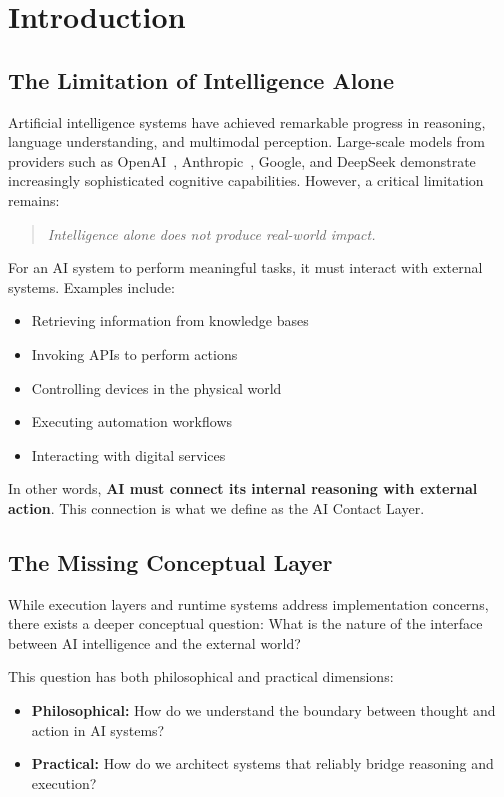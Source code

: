\section{Introduction}

\subsection{The Limitation of Intelligence Alone}
Artificial intelligence systems have achieved remarkable progress in reasoning, language understanding, and multimodal perception. Large-scale models from providers such as OpenAI~\cite{openai2023}, Anthropic~\cite{anthropic2024}, Google, and DeepSeek demonstrate increasingly sophisticated cognitive capabilities. However, a critical limitation remains:

\begin{quote}
\textit{Intelligence alone does not produce real-world impact.}
\end{quote}

For an AI system to perform meaningful tasks, it must interact with external systems. Examples include:
\begin{itemize}[leftmargin=*]
\item Retrieving information from knowledge bases
\item Invoking APIs to perform actions
\item Controlling devices in the physical world
\item Executing automation workflows
\item Interacting with digital services
\end{itemize}

In other words, \textbf{AI must connect its internal reasoning with external action}. This connection is what we define as the AI Contact Layer.

\subsection{The Missing Conceptual Layer}
While execution layers and runtime systems address implementation concerns, there exists a deeper conceptual question: What is the nature of the interface between AI intelligence and the external world?

This question has both philosophical and practical dimensions:
\begin{itemize}[leftmargin=*]
\item \textbf{Philosophical:} How do we understand the boundary between thought and action in AI systems?
\item \textbf{Practical:} How do we architect systems that reliably bridge reasoning and execution?
\end{itemize}

